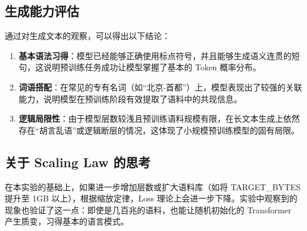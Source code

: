 \documentclass[a4paper,12pt]{ctexart} %
\begin{document}
\subsection{生成能力评估}
通过对生成文本的观察，可以得出以下结论：
\begin{enumerate}
    \item \textbf{基本语法习得}：模型已经能够正确使用标点符号，并且能够生成语义连贯的短句，这说明预训练任务成功让模型掌握了基本的 Token 概率分布。
    \item \textbf{词语搭配}：在常见的专有名词（如“北京-首都”）上，模型表现出了较强的关联能力，说明模型在预训练阶段有效提取了语料中的共现信息。
    \item \textbf{逻辑局限性}：由于模型层数较浅且预训练语料规模有限，在长文本生成上依然存在“胡言乱语”或逻辑断层的情况，这体现了小规模预训练模型的固有局限。
\end{enumerate}

\subsection{关于 Scaling Law 的思考}
在本实验的基础上，如果进一步增加层数或扩大语料库（如将 TARGET\_BYTES 提升至 1GB 以上），根据缩放定律，Loss 理论上会进一步下降。实验中观察到的现象也验证了这一点：即使是几百兆的语料，也能让随机初始化的 Transformer 产生质变，习得基本的语言模式。
\end{document}
